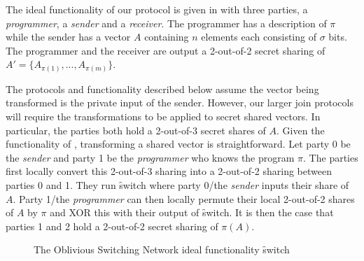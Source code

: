 The ideal functionality of our protocol is given in  with three parties, a \emph{programmer}, a \emph{sender} and a \emph{receiver}. The programmer has a description of  $\pi$ while the sender has a vector $A$ containing $n$ elements each consisting of $\sigma$ bits. The programmer and the receiver are output a 2-out-of-2 secret sharing of $A'=\{A_{\pi(1)}, ..., A_{\pi(m)}\}$.


The protocols and functionality described below assume the vector being transformed is the private input of the sender. However, our larger join protocols will require the transformations to be applied to secret shared vectors. In particular, the parties both hold a 2-out-of-3 secret shares of $A$. Given the functionality of , transforming a shared vector is straightforward. Let party 0 be the \emph{sender} and party 1 be the \emph{programmer} who knows the program $\pi$. The parties first locally convert this 2-out-of-3 sharing into a 2-out-of-2 sharing between parties 0 and 1. They run \f{switch} where party 0/the \emph{sender} inputs their share of $A$. Party 1/the \emph{programmer} can then locally permute their local 2-out-of-2 shares of $A$ by $\pi$ and XOR this with their output of  \f{switch}. It is then the case that parties 1 and 2 hold a 2-out-of-2 secret sharing of $\pi(A)$.

\begin{figure}[ht]
	\caption{The Oblivious Switching Network ideal functionality \f{switch}}
	\label{fig:perm-ideal}	
\end{figure}


